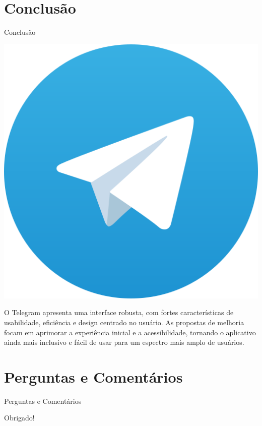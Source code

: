 \documentclass[aspectratio=169,xcolor=table]{beamer}
\begin{document}
\section{Conclusão}
\begin{frame}{Conclusão}
    \begin{center}
        \includegraphics[height=0.4\textheight]{telegram-logo.png}
    \end{center}
    
    O Telegram apresenta uma interface robusta, com fortes características de usabilidade, eficiência e design centrado no usuário. As propostas de melhoria focam em aprimorar a experiência inicial e a acessibilidade, tornando o aplicativo ainda mais inclusivo e fácil de usar para um espectro mais amplo de usuários.
\end{frame}

\section{Perguntas e Comentários}
\begin{frame}{Perguntas e Comentários}
    \begin{center}
        \Huge Obrigado!
    \end{center}
\end{frame}
\end{document}
